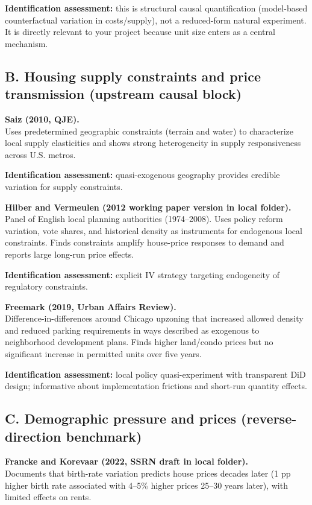 \documentclass[11pt]{article}
\begin{document}
\textbf{Identification assessment:} this is structural causal quantification (model-based counterfactual variation in costs/supply), not a reduced-form natural experiment. It is directly relevant to your project because unit size enters as a central mechanism.

\subsection*{B. Housing supply constraints and price transmission (upstream causal block)}
\textbf{Saiz (2010, QJE).} \\
Uses predetermined geographic constraints (terrain and water) to characterize local supply elasticities and shows strong heterogeneity in supply responsiveness across U.S. metros.

\textbf{Identification assessment:} quasi-exogenous geography provides credible variation for supply constraints.

\textbf{Hilber and Vermeulen (2012 working paper version in local folder).} \\
Panel of English local planning authorities (1974--2008). Uses policy reform variation, vote shares, and historical density as instruments for endogenous local constraints. Finds constraints amplify house-price responses to demand and reports large long-run price effects.

\textbf{Identification assessment:} explicit IV strategy targeting endogeneity of regulatory constraints.

\textbf{Freemark (2019, Urban Affairs Review).} \\
Difference-in-differences around Chicago upzoning that increased allowed density and reduced parking requirements in ways described as exogenous to neighborhood development plans. Finds higher land/condo prices but no significant increase in permitted units over five years.

\textbf{Identification assessment:} local policy quasi-experiment with transparent DiD design; informative about implementation frictions and short-run quantity effects.

\subsection*{C. Demographic pressure and prices (reverse-direction benchmark)}
\textbf{Francke and Korevaar (2022, SSRN draft in local folder).} \\
Documents that birth-rate variation predicts house prices decades later (1 pp higher birth rate associated with 4--5\% higher prices 25--30 years later), with limited effects on rents.
\end{document}
